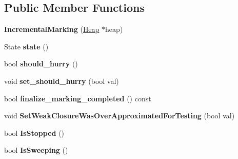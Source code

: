 \subsection*{Public Member Functions}
\begin{DoxyCompactItemize}
\item 
{\bfseries Incremental\+Marking} (\hyperlink{classv8_1_1internal_1_1_heap}{Heap} $\ast$heap)\hypertarget{classv8_1_1internal_1_1_incremental_marking_acc8e76ccd2bba2a64a51e1a7868da631}{}\label{classv8_1_1internal_1_1_incremental_marking_acc8e76ccd2bba2a64a51e1a7868da631}

\item 
State {\bfseries state} ()\hypertarget{classv8_1_1internal_1_1_incremental_marking_ac925255a70637ba1198681021e534736}{}\label{classv8_1_1internal_1_1_incremental_marking_ac925255a70637ba1198681021e534736}

\item 
bool {\bfseries should\+\_\+hurry} ()\hypertarget{classv8_1_1internal_1_1_incremental_marking_a124934f9bf0fb39cf56ea099611de7c3}{}\label{classv8_1_1internal_1_1_incremental_marking_a124934f9bf0fb39cf56ea099611de7c3}

\item 
void {\bfseries set\+\_\+should\+\_\+hurry} (bool val)\hypertarget{classv8_1_1internal_1_1_incremental_marking_a9eafdc076169d642d57722f6ace91299}{}\label{classv8_1_1internal_1_1_incremental_marking_a9eafdc076169d642d57722f6ace91299}

\item 
bool {\bfseries finalize\+\_\+marking\+\_\+completed} () const \hypertarget{classv8_1_1internal_1_1_incremental_marking_a5710e84ecc251107d860a6d6b3a302c2}{}\label{classv8_1_1internal_1_1_incremental_marking_a5710e84ecc251107d860a6d6b3a302c2}

\item 
void {\bfseries Set\+Weak\+Closure\+Was\+Over\+Approximated\+For\+Testing} (bool val)\hypertarget{classv8_1_1internal_1_1_incremental_marking_ae266e583cd45869e2670df0f186bc3fd}{}\label{classv8_1_1internal_1_1_incremental_marking_ae266e583cd45869e2670df0f186bc3fd}

\item 
bool {\bfseries Is\+Stopped} ()\hypertarget{classv8_1_1internal_1_1_incremental_marking_aadf8cd9439174d9f41e900ad9d6cfbe9}{}\label{classv8_1_1internal_1_1_incremental_marking_aadf8cd9439174d9f41e900ad9d6cfbe9}

\item 
bool {\bfseries Is\+Sweeping} ()\hypertarget{classv8_1_1internal_1_1_incremental_marking_a066fa5758b3e18ccfd04876c4bc97e2c}{}\label{classv8_1_1internal_1_1_incremental_marking_a066fa5758b3e18ccfd04876c4bc97e2c}


\end{DoxyCompactItemize}
